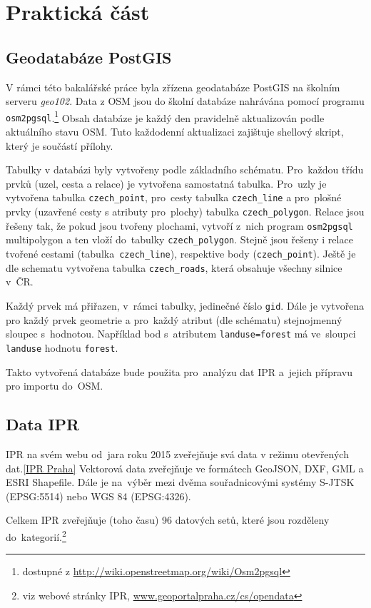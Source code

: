 \chapter{Praktická část}
\label{4-Praktická část}

\section{Geodatabáze PostGIS}
\label{Geodatabaze PostGIS} 
V rámci této bakalářské práce byla zřízena geodatabáze PostGIS na školním
serveru {\em geo102}. Data z OSM jsou do školní databáze nahrávána pomocí programu {\tt osm2pgsql}.\footnote{dostupné z \url{http://wiki.openstreetmap.org/wiki/Osm2pgsql}}
Obsah databáze je každý den pravidelně aktualizován podle aktuálního stavu OSM.
Tuto každodenní aktualizaci zajištuje shellový skript, který je součástí přílohy.

Tabulky v databázi byly vytvořeny podle základního schématu. Pro~každou třídu prvků (uzel, cesta
a relace) je vytvořena samostatná tabulka. Pro~uzly je vytvořena
tabulka {\tt czech\_point}, pro~cesty tabulka {\tt czech\_line} a pro~plošné prvky (uzavřené cesty s atributy
pro~plochy) tabulka {\tt czech\_polygon}. Relace jsou
řešeny tak, že pokud jsou tvořeny plochami, vytvoří z~nich program
{\tt osm2pgsql} multipolygon a ten vloží do~tabulky {\tt czech\_polygon}. Stejně jsou
řešeny i relace tvořené cestami (tabulka~{\tt czech\_line}), respektive body
({\tt czech\_point}). Ještě je dle schematu vytvořena tabulka
{\tt czech\_roads}, která obsahuje všechny silnice v~ČR.

Každý prvek má přiřazen, v~rámci tabulky, jedinečné číslo {\tt gid}.
Dále je vytvořena pro každý prvek geometrie a pro~každý
atribut (dle schématu) stejnojmenný sloupec s~hodnotou. Například
bod s~atributem {\tt landuse=forest} má ve~sloupci {\tt landuse}
hodnotu {\tt forest}.

Takto vytvořená databáze bude použita pro~analýzu dat IPR a~jejich přípravu pro importu do~OSM.

\section{Data IPR}
\label{IPR data}
IPR na svém webu od~jara roku 2015 zveřejňuje svá data v režimu otevřených dat.\ref{IPR Praha}
Vektorová data zveřejňuje ve formátech GeoJSON, DXF, GML a ESRI Shapefile. Dále je na~výběr mezi dvěma
souřadnicovými systémy S-JTSK (EPSG:5514) nebo WGS 84 (EPSG:4326).

Celkem IPR zveřejňuje (toho času) 96 datových setů, které jsou rozděleny
do~kategorií.\footnote{viz webové stránky IPR, \url{www.geoportalpraha.cz/cs/opendata}}


